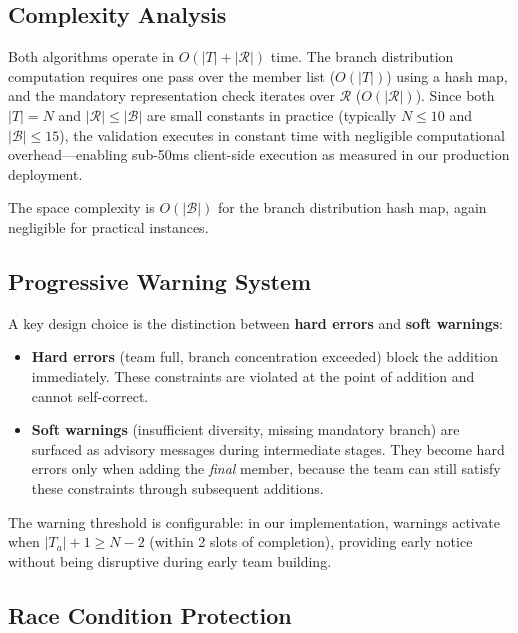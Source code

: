 \documentclass[conference]{IEEEtran}
\begin{document}
\subsection{Complexity Analysis}

Both algorithms operate in $O(|T| + |\mathcal{R}|)$ time. The branch distribution computation requires one pass over the member list ($O(|T|)$) using a hash map, and the mandatory representation check iterates over $\mathcal{R}$ ($O(|\mathcal{R}|)$). Since both $|T| = N$ and $|\mathcal{R}| \leq |\mathcal{B}|$ are small constants in practice (typically $N \leq 10$ and $|\mathcal{B}| \leq 15$), the validation executes in constant time with negligible computational overhead---enabling sub-50ms client-side execution as measured in our production deployment.

The space complexity is $O(|\mathcal{B}|)$ for the branch distribution hash map, again negligible for practical instances.

\subsection{Progressive Warning System}

A key design choice is the distinction between \textbf{hard errors} and \textbf{soft warnings}:

\begin{itemize}[noitemsep,topsep=3pt]
    \item \textbf{Hard errors} (team full, branch concentration exceeded) block the addition immediately. These constraints are violated at the point of addition and cannot self-correct.
    \item \textbf{Soft warnings} (insufficient diversity, missing mandatory branch) are surfaced as advisory messages during intermediate stages. They become hard errors only when adding the \textit{final} member, because the team can still satisfy these constraints through subsequent additions.
\end{itemize}

The warning threshold is configurable: in our implementation, warnings activate when $|T_a| + 1 \geq N - 2$ (within 2 slots of completion), providing early notice without being disruptive during early team building.

\subsection{Race Condition Protection}
\end{document}
